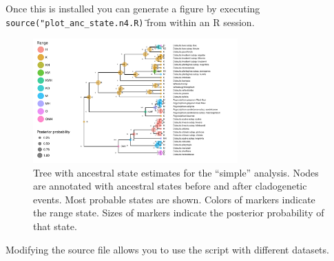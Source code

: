 Once this is installed you can generate a figure by executing {\tt source("plot\_anc\_state.n4.R\")} from within an R session.

\begin{figure}[!ht]
\centering
\includegraphics[width=0.7\textwidth]{figures/fig_simple_RevGadgets_ase.pdf}
\caption{Tree with ancestral state estimates for the ``simple'' analysis. Nodes are annotated with ancestral states before and after cladogenetic events. Most probable states are shown. Colors of markers indicate the range state. Sizes of markers indicate the posterior probability of that state. }
\end{figure}

Modifying the source file allows you to use the script with different datasets.

\newpage
